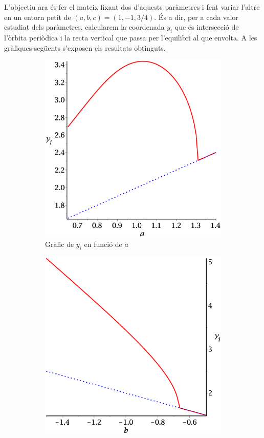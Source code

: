 \documentclass[a4paper]{article}
\theoremstyle{definition}
\begin{document}
L'objectiu ara és fer el mateix fixant dos d'aquests paràmetres i fent variar l'altre en un entorn petit de $(a, b, c) = (1, -1, 3/4)$. És a dir, per a cada valor estudiat dels paràmetres, calcularem la coordenada $y_i$ que és intersecció de l'òrbita periòdica i la recta vertical que passa per l'equilibri al que envolta. A les gràfiques següents s'exposen els resultats obtinguts.

\begin{figure}[ht]
  \centering
  \begin{subfigure}[b]{0.32\linewidth}
    \centering
    \includegraphics[width=\linewidth]{Images/ex2-a.eps}
    \caption{Gràfic de $y_i$ en funció de $a$}
  \end{subfigure}
  \hfill
  \begin{subfigure}[b]{0.32\linewidth}
    \centering
    \includegraphics[width=\linewidth]{Images/ex2-b.eps}

\end{subfigure}
\end{figure}
\end{document}
